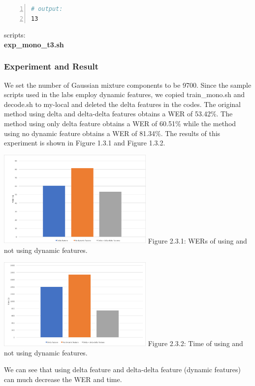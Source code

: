 \documentclass[]{article}
\begin{document}
\begin{multicols*}{2}
\begin{lstlisting}[language=sh,showstringspaces=false,numbers=left,tabsize=4, xleftmargin=\parindent, frame=single, basicstyle=\tiny]
# output:
13
\end{lstlisting}

scripts: \textbf{\\ \indent exp\_mono\_t3.sh}


\subsubsection{Experiment and Result}
We set the number of Gaussian mixture components to be 9700. Since the sample scripts used in the labs employ dynamic features, we copied train\_mono.sh and decode.sh to my-local and deleted the delta features in the codes. The original method using delta and delta-delta features obtains a WER of 53.42\%. The method using only delta feature obtains a WER of 60.51\% while the method using no dynamic feature obtains a WER of 81.34\%. The results of this experiment is shown in Figure 1.3.1 and Figure 1.3.2. 

\begin{center}
\includegraphics[width=3in]{Picture4.png} 
Figure 2.3.1: WERs of using and not using dynamic features.
\end{center}

\begin{center}
\includegraphics[width=3in]{Picture3.png} 
Figure 2.3.2: Time of using and not using dynamic features.
\end{center}

We can see that using delta feature and delta-delta feature (dynamic features) can much decrease the WER and time.


\end{multicols*}
\end{document}
